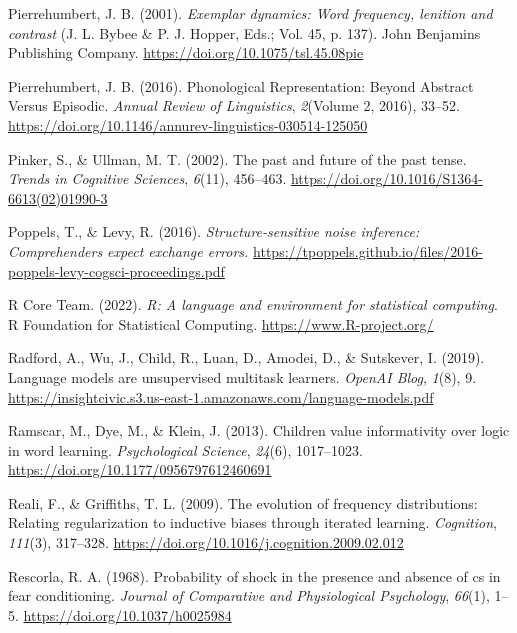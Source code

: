 \documentclass[
  12pt,
  letterpaper,
]{scrreprt}
\newlength{\cslhangindent}
\newenvironment{CSLReferences}[2] %
 {\begin{list}{}{%
  \setlength{\itemindent}{0pt}
  \setlength{\leftmargin}{0pt}
  \setlength{\parsep}{0pt}
  \ifodd #1
   \setlength{\leftmargin}{\cslhangindent}
   \setlength{\itemindent}{-1\cslhangindent}
  \fi
  \setlength{\itemsep}{#2\baselineskip}}}
 {\end{list}}
\begin{document}
\begin{CSLReferences}{1}{0}
Pierrehumbert, J. B. (2001). \emph{Exemplar dynamics: Word frequency,
lenition and contrast} (J. L. Bybee \& P. J. Hopper, Eds.; Vol. 45, p.
137). John Benjamins Publishing Company.
\url{https://doi.org/10.1075/tsl.45.08pie}

Pierrehumbert, J. B. (2016). Phonological Representation: Beyond
Abstract Versus Episodic. \emph{Annual Review of Linguistics},
\emph{2}(Volume 2, 2016), 33--52.
\url{https://doi.org/10.1146/annurev-linguistics-030514-125050}

Pinker, S., \& Ullman, M. T. (2002). The past and future of the past
tense. \emph{Trends in Cognitive Sciences}, \emph{6}(11), 456--463.
\url{https://doi.org/10.1016/S1364-6613(02)01990-3}

Poppels, T., \& Levy, R. (2016). \emph{Structure-sensitive noise
inference: Comprehenders expect exchange errors.}
\url{https://tpoppels.github.io/files/2016-poppels-levy-cogsci-proceedings.pdf}

R Core Team. (2022). \emph{R: A language and environment for statistical
computing}. R Foundation for Statistical Computing.
\url{https://www.R-project.org/}

Radford, A., Wu, J., Child, R., Luan, D., Amodei, D., \& Sutskever, I.
(2019). Language models are unsupervised multitask learners.
\emph{OpenAI Blog}, \emph{1}(8), 9.
\url{https://insightcivic.s3.us-east-1.amazonaws.com/language-models.pdf}

Ramscar, M., Dye, M., \& Klein, J. (2013). Children value informativity
over logic in word learning. \emph{Psychological Science}, \emph{24}(6),
1017--1023. \url{https://doi.org/10.1177/0956797612460691}

Reali, F., \& Griffiths, T. L. (2009). The evolution of frequency
distributions: Relating regularization to inductive biases through
iterated learning. \emph{Cognition}, \emph{111}(3), 317--328.
\url{https://doi.org/10.1016/j.cognition.2009.02.012}

Rescorla, R. A. (1968). Probability of shock in the presence and absence
of cs in fear conditioning. \emph{Journal of Comparative and
Physiological Psychology}, \emph{66}(1), 1--5.
\url{https://doi.org/10.1037/h0025984}


\end{CSLReferences}
\end{document}
